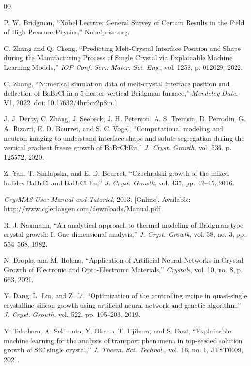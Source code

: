\documentclass[conference]{IEEEtran}
\begin{document}
\begin{thebibliography}{00}

 P. W. Bridgman, ``Nobel Lecture: General Survey of Certain Results in the Field of High-Pressure Physics,'' Nobelprize.org.

 C. Zhang and Q. Cheng, ``Predicting Melt-Crystal Interface Position and Shape during the Manufacturing Process of Single Crystal via Explainable Machine Learning Models,'' \emph{IOP Conf. Ser.: Mater. Sci. Eng.}, vol. 1258, p. 012029, 2022.

 C. Zhang, ``Numerical simulation data of melt-crystal interface position and deflection of BaBrCl in a 5-heater vertical Bridgman furnace,'' \emph{Mendeley Data}, V1, 2022. doi: 10.17632/4hr6cx2p8m.1

 J. J. Derby, C. Zhang, J. Seebeck, J. H. Peterson, A. S. Tremsin, D. Perrodin, G. A. Bizarri, E. D. Bourret, and S. C. Vogel, ``Computational modeling and neutron imaging to understand interface shape and solute segregation during the vertical gradient freeze growth of BaBrCl:Eu,'' \emph{J. Cryst. Growth}, vol. 536, p. 125572, 2020.

 Z. Yan, T. Shalapska, and E. D. Bourret, ``Czochralski growth of the mixed halides BaBrCl and BaBrCl:Eu,'' \emph{J. Cryst. Growth}, vol. 435, pp. 42--45, 2016.

 \emph{CrysMAS User Manual and Tutorial}, 2013. [Online]. Available: http://www.cglerlangen.com/downloads/Manual.pdf

 R. J. Naumann, ``An analytical approach to thermal modeling of Bridgman-type crystal growth: I. One-dimensional analysis,'' \emph{J. Cryst. Growth}, vol. 58, no. 3, pp. 554--568, 1982.

 N. Dropka and M. Holena, ``Application of Artificial Neural Networks in Crystal Growth of Electronic and Opto-Electronic Materials,'' \emph{Crystals}, vol. 10, no. 8, p. 663, 2020.

 Y. Dang, L. Liu, and Z. Li, ``Optimization of the controlling recipe in quasi-single crystalline silicon growth using artificial neural network and genetic algorithm,'' \emph{J. Cryst. Growth}, vol. 522, pp. 195--203, 2019.

 Y. Takehara, A. Sekimoto, Y. Okano, T. Ujihara, and S. Dost, ``Explainable machine learning for the analysis of transport phenomena in top-seeded solution growth of SiC single crystal,'' \emph{J. Therm. Sci. Technol.}, vol. 16, no. 1, JTST0009, 2021.


\end{thebibliography}
\end{document}
